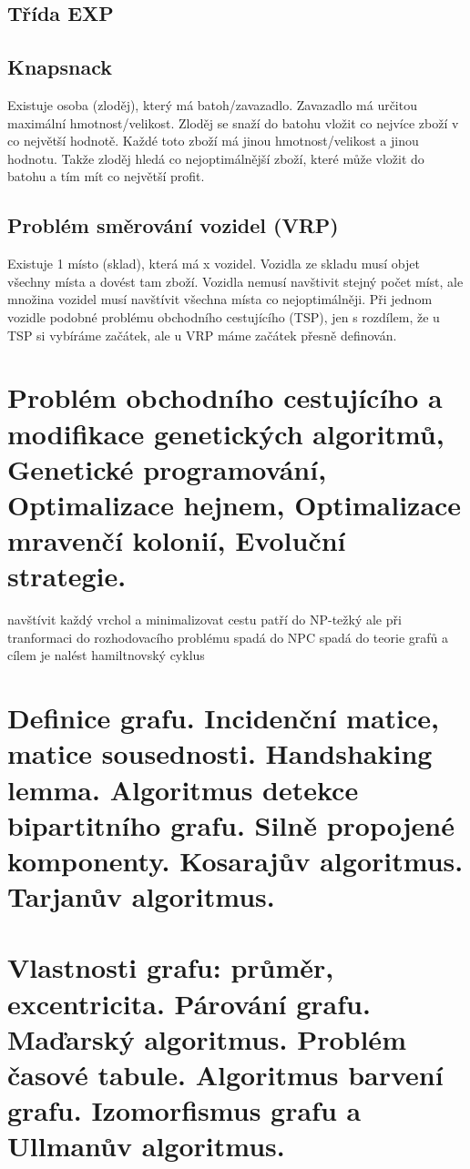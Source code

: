\subsection{Třída EXP}

\subsection{Knapsnack}

Existuje osoba (zloděj), který má batoh/zavazadlo.
Zavazadlo má určitou maximální hmotnost/velikost.
Zloděj se snaží do batohu vložit co nejvíce zboží v co největší hodnotě. 
Každé toto zboží má jinou hmotnost/velikost a jinou hodnotu.
Takže zloděj hledá co nejoptimálnější zboží, které může vložit do batohu a tím mít co největší profit.

\subsection{Problém směrování vozidel (VRP)}

Existuje 1 místo (sklad), která má x vozidel.
Vozidla ze skladu musí objet všechny místa a dovést tam zboží. 
Vozidla nemusí navštivit stejný počet míst, ale množina vozidel musí navštívit všechna místa co nejoptimálněji. 
Při jednom vozidle podobné problému obchodního cestujícího (TSP), jen s rozdílem, že u TSP si vybíráme začátek, ale u VRP máme začátek přesně definován.


\clearpage
\section{Problém obchodního cestujícího a modifikace genetických algoritmů, Genetické programování, Optimalizace hejnem, Optimalizace mravenčí kolonií, Evoluční strategie.}

navštívit každý vrchol a minimalizovat cestu
patří do NP-težký ale při tranformaci do rozhodovacího problému spadá do NPC 
spadá do teorie grafů a cílem je nalést hamiltnovský cyklus


\clearpage
\section{Definice grafu. Incidenční matice, matice sousednosti. Handshaking lemma. Algoritmus detekce bipartitního grafu. Silně propojené komponenty. Kosarajův algoritmus. Tarjanův algoritmus.}


\clearpage
\section{Vlastnosti grafu: průměr, excentricita. Párování grafu. Maďarský algoritmus. Problém časové tabule. Algoritmus barvení grafu. Izomorfismus grafu a Ullmanův algoritmus.}


